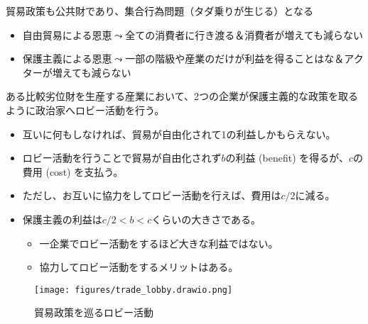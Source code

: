 \documentclass[
  xelatex,
  ja=standard]{bxjsarticle}
\providecommand{\tightlist}{%
  \setlength{\itemsep}{0pt}\setlength{\parskip}{0pt}}\usepackage{longtable,booktabs,array}
\begin{document}
貿易政策も公共財であり、集合行為問題（タダ乗りが生じる）となる

\begin{itemize}
\tightlist
\item
  自由貿易による恩恵\(\leadsto\)全ての消費者に行き渡る＆消費者が増えても減らない
\item
  保護主義による恩恵\(\leadsto\)一部の階級や産業のだけが利益を得ることはな＆アクターが増えても減らない
\end{itemize}

\begin{tcolorbox}[enhanced jigsaw, coltitle=black, breakable, opacitybacktitle=0.6, left=2mm, titlerule=0mm, arc=.35mm, colbacktitle=quarto-callout-tip-color!10!white, opacityback=0, leftrule=.75mm, title=\textcolor{quarto-callout-tip-color}{\faLightbulb}\hspace{0.5em}{貿易政策を巡るロビー活動}, toptitle=1mm, bottomrule=.15mm, colframe=quarto-callout-tip-color-frame, toprule=.15mm, colback=white, rightrule=.15mm, bottomtitle=1mm]

ある比較劣位財を生産する産業において、2つの企業が保護主義的な政策を取るように政治家へロビー活動を行う。

\begin{itemize}
\tightlist
\item
  互いに何もしなければ、貿易が自由化されて1の利益しかもらえない。
\item
  ロビー活動を行うことで貿易が自由化されず\(b\)の利益 (benefit)
  を得るが、\(c\)の費用 (cost) を支払う。
\item
  ただし、お互いに協力をしてロビー活動を行えば、費用は\(c/2\)に減る。
\item
  保護主義の利益は\(c/2 < b < c\)くらいの大きさである。

  \begin{itemize}
  \tightlist
  \item
    一企業でロビー活動をするほど大きな利益ではない。
  \item
    協力してロビー活動をするメリットはある。
  \end{itemize}
\end{itemize}

\end{tcolorbox}

\begin{figure}[htpb]

{\centering \texttt{[image: figures/trade\_lobby.drawio.png]}

}

\caption{貿易政策を巡るロビー活動}

\end{figure}
\end{document}
